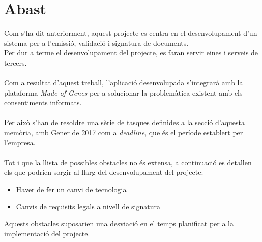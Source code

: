 \section{Abast}
\label{gestio:abast}
Com s'ha dit anteriorment, aquest projecte es centra en el desenvolupament d'un sistema per a l'emissió, validació i signatura de documents.\\
Per dur a terme el desenvolupament del projecte, es faran servir eines i serveis de tercers.\\
\\Com a resultat d'aquest treball, l'aplicació desenvolupada s'integrarà amb la plataforma \textit{Made of Genes} per a solucionar la problemàtica existent amb els consentiments informats.\\
\\Per això s'han de resoldre una sèrie de tasques definides a la secció  d'aquesta memòria, amb Gener de 2017 com a \textit{deadline}, que és el període establert per l'empresa.\\
\\Tot i que la llista de possibles obstacles no és extensa, a continuació es detallen els que podrien sorgir al llarg del desenvolupament del projecte:
\begin{itemize}
    \item Haver de fer un canvi de tecnologia
    \item Canvis de requisits legals a nivell de signatura
\end{itemize}
Aquests obstacles suposarien una desviació en el temps planificat per a la implementació del projecte.
